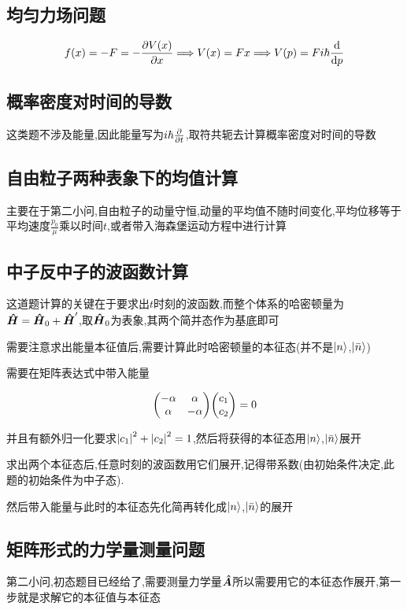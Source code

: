         \subsection{均匀力场问题}
            $$ f(x) = -F = - \pdv{V(x)}{x} \Longrightarrow V(x) = F x \Longrightarrow V(p) = Fi\hbar \dv{p}$$

        \subsection{概率密度对时间的导数}
            这类题不涉及能量,因此能量写为$i\hbar \pdv{t}$,取符共轭去计算概率密度对时间的导数

        \subsection{自由粒子两种表象下的均值计算}
            主要在于第二小问,自由粒子的动量守恒,动量的平均值不随时间变化,平均位移等于平均速度$\frac{p_{0}}{\mu}$乘以时间$t$,或者带入海森堡运动方程中进行计算
        
        \subsection{中子反中子的波函数计算}
            这道题计算的关键在于要求出$t$时刻的波函数,而整个体系的哈密顿量为$\vu*{H} = \vu*{H}_{0} + \vu*{H}'$,取$\vu*{H}_{0}$为表象,其两个简并态作为基底即可

            需要注意求出能量本征值后,需要计算此时哈密顿量的本征态(并不是$\ket{n}$,$\ket{\bar{n}}$)

            需要在矩阵表达式中带入能量 
            
            $$ \mqty(-\alpha & \alpha \\ \alpha & -\alpha) \mqty(c_{1} \\ c_{2}) = 0 $$

            并且有额外归一化要求$ \abs{c_{1}}^{2} + \abs{c_{2}}^{2} = 1 $,然后将获得的本征态用$\ket{n}$,$\ket{\bar{n}}$展开
            
            求出两个本征态后,任意时刻的波函数用它们展开,记得带系数(由初始条件决定,此题的初始条件为中子态).

            然后带入能量与此时的本征态先化简再转化成$\ket{n}$,$\ket{\bar{n}}$的展开

        \subsection{矩阵形式的力学量测量问题}
            第二小问,初态题目已经给了,需要测量力学量$\vu*{A}$所以需要用它的本征态作展开,第一步就是求解它的本征值与本征态

